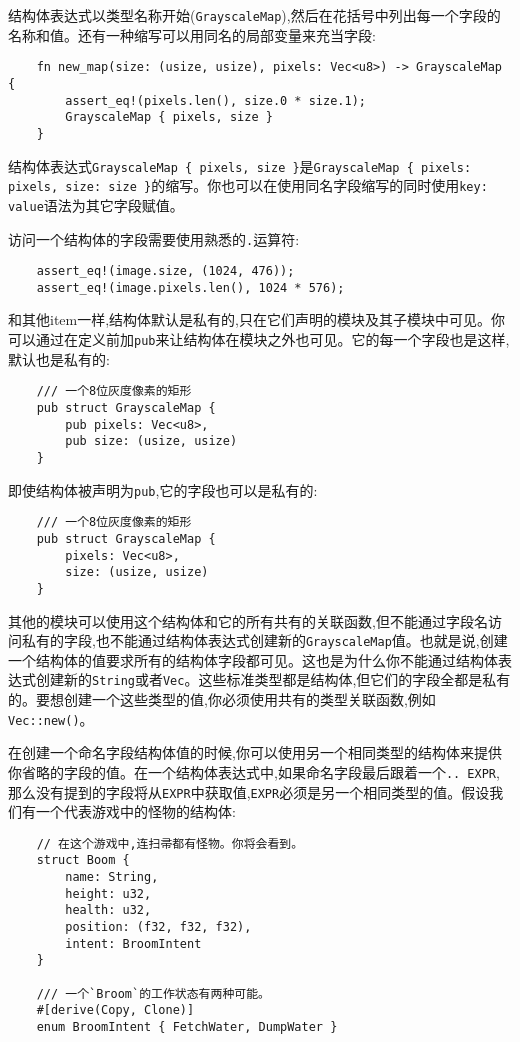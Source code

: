 结构体表达式以类型名称开始(\texttt{GrayscaleMap}),然后在花括号中列出每一个字段的名称和值。还有一种缩写可以用同名的局部变量来充当字段:
\begin{verbatim}
    fn new_map(size: (usize, usize), pixels: Vec<u8>) -> GrayscaleMap {
        assert_eq!(pixels.len(), size.0 * size.1);
        GrayscaleMap { pixels, size }
    }
\end{verbatim}

结构体表达式\texttt{GrayscaleMap \{ pixels, size \}}是\texttt{GrayscaleMap \{ pixels: pixels, size: size \}}的缩写。你也可以在使用同名字段缩写的同时使用\texttt{key: value}语法为其它字段赋值。

访问一个结构体的字段需要使用熟悉的\texttt{.}运算符:
\begin{verbatim}
    assert_eq!(image.size, (1024, 476));
    assert_eq!(image.pixels.len(), 1024 * 576);
\end{verbatim}

和其他item一样,结构体默认是私有的,只在它们声明的模块及其子模块中可见。你可以通过在定义前加\texttt{pub}来让结构体在模块之外也可见。它的每一个字段也是这样,默认也是私有的:
\begin{verbatim}
    /// 一个8位灰度像素的矩形
    pub struct GrayscaleMap {
        pub pixels: Vec<u8>,
        pub size: (usize, usize)
    }
\end{verbatim}

即使结构体被声明为\texttt{pub},它的字段也可以是私有的:
\begin{verbatim}
    /// 一个8位灰度像素的矩形
    pub struct GrayscaleMap {
        pixels: Vec<u8>,
        size: (usize, usize)
    }
\end{verbatim}

其他的模块可以使用这个结构体和它的所有共有的关联函数,但不能通过字段名访问私有的字段,也不能通过结构体表达式创建新的\texttt{GrayscaleMap}值。也就是说,创建一个结构体的值要求所有的结构体字段都可见。这也是为什么你不能通过结构体表达式创建新的\texttt{String}或者\texttt{Vec}。这些标准类型都是结构体,但它们的字段全都是私有的。要想创建一个这些类型的值,你必须使用共有的类型关联函数,例如\texttt{Vec::new()}。

在创建一个命名字段结构体值的时候,你可以使用另一个相同类型的结构体来提供你省略的字段的值。在一个结构体表达式中,如果命名字段最后跟着一个\texttt{.. EXPR},那么没有提到的字段将从\texttt{EXPR}中获取值,\texttt{EXPR}必须是另一个相同类型的值。假设我们有一个代表游戏中的怪物的结构体:
\begin{verbatim}
    // 在这个游戏中,连扫帚都有怪物。你将会看到。
    struct Boom {
        name: String,
        height: u32,
        health: u32,
        position: (f32, f32, f32),
        intent: BroomIntent
    }

    /// 一个`Broom`的工作状态有两种可能。
    #[derive(Copy, Clone)]
    enum BroomIntent { FetchWater, DumpWater }
\end{verbatim}

